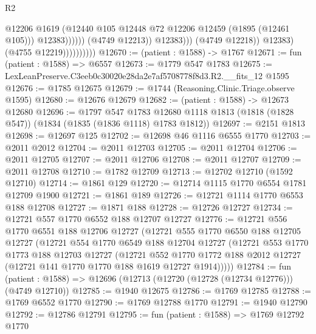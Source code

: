 \begin{lexlean}{R2}
\begin{coremodule}
                                              @12206
                                              @1619
                                              (@12440
                                                @105
                                                @12448
                                                @72
                                                @12206
                                                @12459
                                                (@1895 (@12461 @105)))
                                              @12383))))))
                                  (@4749 @12213))
                                @12383)))
                          (@4749 @12218))
                        @12383)
                      (@4755 @12219))))))))))
@12670 := (patient : @1588) -> @1767
@12671 := fun (patient : @1588) => @6557
@12673 := @1779 @547 @1783
@12675 := LexLeanPreserve.C3eeb0c30020e28da2e7af5708778f8d3.R2.__fits_12 @1595
@12676 := @1785 @12675
@12679 := @1744 (Reasoning.Clinic.Triage.observe @1595)
@12680 := @12676 @12679
@12682 := (patient : @1588) -> @12673 @12680
@12696 := @1797
    @547
    @1783
    @12680
    @1118
    @1813
    (@1818 (@1828 @547))
    (@1834 (@1835 (@1836 @1118) @1783 @1812))
@12697 := @2151 @1813
@12698 := @12697 @125
@12702 := @12698 @46 @1116 @6555 @1770
@12703 := @2011 @2012
@12704 := @2011 @12703
@12705 := @2011 @12704
@12706 := @2011 @12705
@12707 := @2011 @12706
@12708 := @2011 @12707
@12709 := @2011 @12708
@12710 := @1782 @12709
@12713 := @12702 @12710 (@1592 @12710)
@12714 := @1861 @129
@12720 := @12714 @1115 @1770 @6554 @1781 @12709 @1900
@12721 := @1861 @189
@12726 := @12721 @1114 @1770 @6553 @188 @12708
@12727 := @1871 @188
@12728 := @12726 @12727
@12734 := @12721 @557 @1770 @6552 @188 @12707 @12727
@12776 := @12721
    @556
    @1770
    @6551
    @188
    @12706
    @12727
    (@12721
      @555
      @1770
      @6550
      @188
      @12705
      @12727
      (@12721
        @554
        @1770
        @6549
        @188
        @12704
        @12727
        (@12721
          @553
          @1770
          @1773
          @188
          @12703
          @12727
          (@12721
            @552
            @1770
            @1772
            @188
            @2012
            @12727
            (@12721 @141 @1770 @1770 @188 @1619 @12727 @1914)))))
@12784 := fun (patient : @1588) => @12696 (@12713 (@12720 (@12728 (@12734 @12776))) (@4749 @12710))
@12785 := @1940 @12675
@12786 := @1769 @12785
@12788 := @1769 @6552 @1770
@12790 := @1769 @12788 @1770
@12791 := @1940 @12790
@12792 := @12786 @12791
@12795 := fun (patient : @1588) => @1769 @12792 @1770

\end{coremodule}
\end{lexlean}
